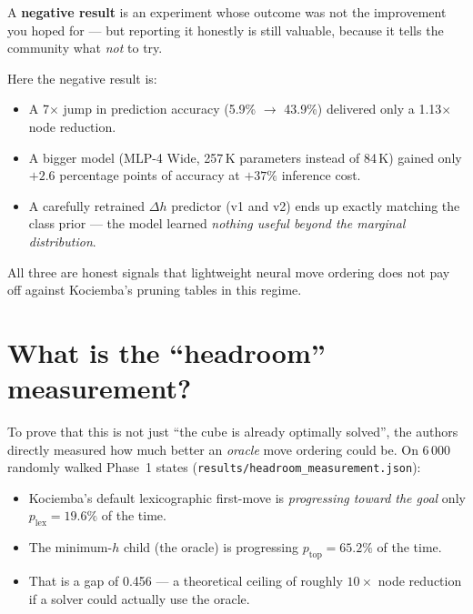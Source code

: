\documentclass[11pt,a4paper]{article}
\newcommand{\defn}[1]{\textbf{#1}}
\begin{document}
A \defn{negative result} is an experiment whose outcome was not the
improvement you hoped for --- but reporting it honestly is still
valuable, because it tells the community what \emph{not} to try.

Here the negative result is:

\begin{itemize}[leftmargin=2em]
  \item A 7$\times$ jump in prediction accuracy (5.9\% $\to$ 43.9\%)
        delivered only a 1.13$\times$ node reduction.
  \item A bigger model (MLP-4 Wide, 257\,K parameters instead of 84\,K)
        gained only $+2.6$ percentage points of accuracy at $+37\%$
        inference cost.
  \item A carefully retrained $\Delta h$ predictor (v1 and v2) ends up
        exactly matching the class prior --- the model learned
        \emph{nothing useful beyond the marginal distribution}.
\end{itemize}

All three are honest signals that lightweight neural move ordering does
not pay off against Kociemba's pruning tables in this regime.

\section{What is the ``headroom'' measurement?}

To prove that this is not just ``the cube is already optimally solved'',
the authors directly measured how much better an \emph{oracle} move
ordering could be. On 6\,000 randomly walked Phase~1 states
(\texttt{results/\allowbreak headroom\_\allowbreak measurement.json}):

\begin{itemize}[leftmargin=2em]
  \item Kociemba's default lexicographic first-move is \emph{progressing
        toward the goal} only $p_{\text{lex}} = 19.6\%$ of the time.
  \item The minimum-$h$ child (the oracle) is progressing
        $p_{\text{top}} = 65.2\%$ of the time.
  \item That is a gap of 0.456 --- a theoretical ceiling of roughly
        $10\times$ node reduction if a solver could actually use the
        oracle.
\end{itemize}
\end{document}
